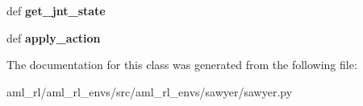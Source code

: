 \begin{DoxyCompactItemize}
\item 
\hypertarget{classaml__rl__envs_1_1sawyer_1_1sawyer_1_1_sawyer_a4a67acc60c14462429bb031502a5bd79}{def {\bfseries get\-\_\-jnt\-\_\-state}}\label{classaml__rl__envs_1_1sawyer_1_1sawyer_1_1_sawyer_a4a67acc60c14462429bb031502a5bd79}

\item 
\hypertarget{classaml__rl__envs_1_1sawyer_1_1sawyer_1_1_sawyer_a2ff0310c66e1302d20127678cabebf4c}{def {\bfseries apply\-\_\-action}}\label{classaml__rl__envs_1_1sawyer_1_1sawyer_1_1_sawyer_a2ff0310c66e1302d20127678cabebf4c}

\end{DoxyCompactItemize}


The documentation for this class was generated from the following file\-:\begin{DoxyCompactItemize}
\item 
aml\-\_\-rl/aml\-\_\-rl\-\_\-envs/src/aml\-\_\-rl\-\_\-envs/sawyer/sawyer.\-py\end{DoxyCompactItemize}
